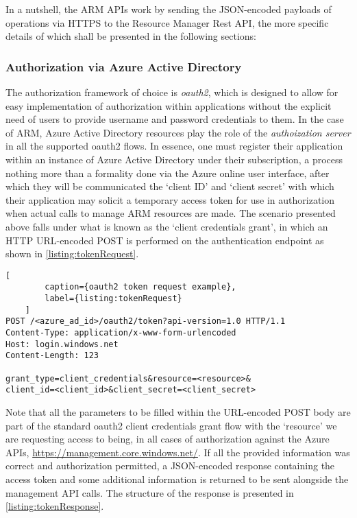 \documentclass[11pt]{report}
\begin{document}
In a nutshell, the ARM APIs work by sending the JSON-encoded payloads of
operations via HTTPS to the Resource Manager Rest API, the more specific
details of which shall be presented in the following sections:

\subsubsection{Authorization via Azure Active Directory}

The authorization framework of choice is \textit{oauth2}, which is designed to
allow for easy implementation of authorization within applications without the
explicit need of users to provide username and password credentials to them. In
the case of ARM, Azure Active Directory resources play the role of the
\textit{authoization server} in all the supported oauth2 flows. \newline
In essence, one must register their application within an instance of Azure
Active Directory under their subscription, a process nothing more than a
formality done via the Azure online user interface, after which they will be
communicated the `client ID' and `client secret' with which their application
may solicit a temporary access token for use in authorization when actual calls
to manage ARM resources are made. \newline
The scenario presented above falls under what is known as the `client
credentials grant', in which an HTTP URL-encoded POST is performed on the
authentication endpoint as shown in \ref{listing:tokenRequest}.

\begin{lstlisting}[
        caption={oauth2 token request example},
        label={listing:tokenRequest}
    ]
POST /<azure_ad_id>/oauth2/token?api-version=1.0 HTTP/1.1
Content-Type: application/x-www-form-urlencoded
Host: login.windows.net
Content-Length: 123

grant_type=client_credentials&resource=<resource>&
client_id=<client_id>&client_secret=<client_secret>
\end{lstlisting}

Note that all the parameters to be filled within the URL-encoded POST body are
part of the standard oauth2 client credentials grant flow with the `resource'
we are requesting access to being, in all cases of authorization against
the Azure APIs, \url{https://management.core.windows.net/}.
If all the provided information was correct and authorization permitted,
a JSON-encoded response containing the access token and some
additional information is returned to be sent alongside the management API
calls. The structure of the response is presented in \ref{listing:tokenResponse}.
\end{document}
